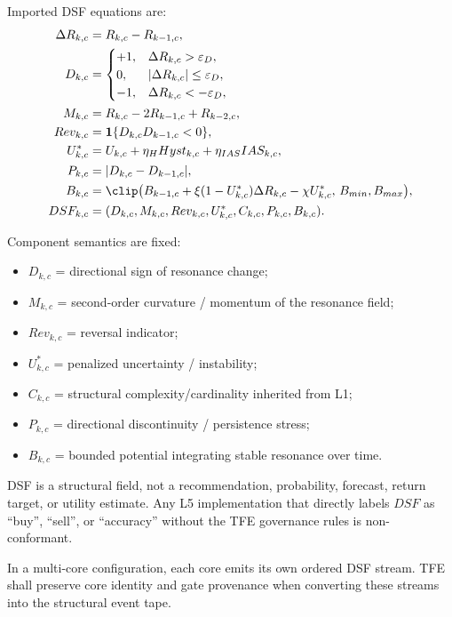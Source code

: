 \documentclass[11pt]{report}
\begin{document}
Imported DSF equations are:
\begin{align*}
\Delta R_{k,c} &= R_{k,c}-R_{k-1,c},\\
D_{k,c} &= \begin{cases}+1,& \Delta R_{k,c}>\varepsilon_D,\\0,& |\Delta R_{k,c}|\le \varepsilon_D,\\-1,& \Delta R_{k,c}< -\varepsilon_D,\end{cases}\\
M_{k,c} &= R_{k,c}-2R_{k-1,c}+R_{k-2,c},\\
Rev_{k,c} &= \mathbf{1}\{D_{k,c}D_{k-1,c}<0\},\\
U^{\ast}_{k,c} &= U_{k,c} + \eta_HHyst_{k,c} + \eta_{IAS}IAS_{k,c},\\
P_{k,c} &= |D_{k,c}-D_{k-1,c}|,\\
B_{k,c} &= \clip\big(B_{k-1,c}+\xi(1-U^{\ast}_{k,c})\Delta R_{k,c}-\chi U^{\ast}_{k,c},\,B_{min},B_{max}\big),\\
DSF_{k,c} &= (D_{k,c},M_{k,c},Rev_{k,c},U^{\ast}_{k,c},C_{k,c},P_{k,c},B_{k,c}).
\end{align*}

Component semantics are fixed:
\begin{itemize}
    \item $D_{k,c}$ = directional sign of resonance change;
    \item $M_{k,c}$ = second-order curvature / momentum of the resonance field;
    \item $Rev_{k,c}$ = reversal indicator;
    \item $U^{\ast}_{k,c}$ = penalized uncertainty / instability;
    \item $C_{k,c}$ = structural complexity/cardinality inherited from L1;
    \item $P_{k,c}$ = directional discontinuity / persistence stress;
    \item $B_{k,c}$ = bounded potential integrating stable resonance over time.
\end{itemize}

DSF is a structural field, not a recommendation, probability, forecast, return target, or utility estimate. Any L5 implementation that directly labels $DSF$ as ``buy'', ``sell'', or ``accuracy'' without the TFE governance rules is non-conformant.

In a multi-core configuration, each core emits its own ordered DSF stream. TFE shall preserve core identity and gate provenance when converting these streams into the structural event tape.
\end{document}
